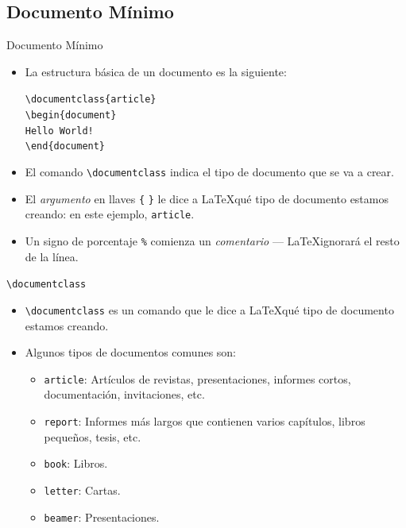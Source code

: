 \documentclass[12pt]{beamer}
\begin{document}
\subsection{Documento Mínimo}
\begin{frame}{Documento Mínimo}
  \begin{itemize}
    \item La estructura básica de un documento es la siguiente:
    \begin{center}
    \begin{minipage}{0.5\textwidth}    
    \begin{block}{}
        \texttt{\textbackslash documentclass\{article\}\\
        \textbackslash begin\{document\}\\
         \hspace{1cm}Hello World!\\
        \textbackslash end\{document\}}
      \end{block}
      \end{minipage}
    \end{center}
    \item<2-> El comando \texttt{\textbackslash documentclass} indica el tipo de documento que se va a crear.
    \item<3-> El \emph{argumento} en llaves \texttt{\{} \texttt{\}} le dice a \LaTeX qué tipo de documento estamos creando: en este ejemplo, \texttt{article}.
    \item<4-> Un signo de porcentaje \texttt{\%} comienza un \emph{comentario} --- \LaTeX ignorará el resto de la línea.
  \end{itemize}
\end{frame}
\begin{frame}{\texttt{\textbackslash documentclass}}
  \begin{itemize}
    \item \texttt{\textbackslash documentclass} es un comando que le dice a \LaTeX qué tipo de documento estamos creando.
    \item<2-> Algunos tipos de documentos comunes son:
    \begin{itemize}
      \item \texttt{article}: Artículos de revistas, presentaciones, informes cortos, documentación, invitaciones, etc.
      \item<3-> \texttt{report}: Informes más largos que contienen varios capítulos, libros pequeños, tesis, etc.
      \item<4-> \texttt{book}: Libros.
      \item<5-> \texttt{letter}: Cartas.
      \item<6-> \texttt{beamer}: Presentaciones.
    \end{itemize}
  \end{itemize}
\end{frame}
\end{document}
